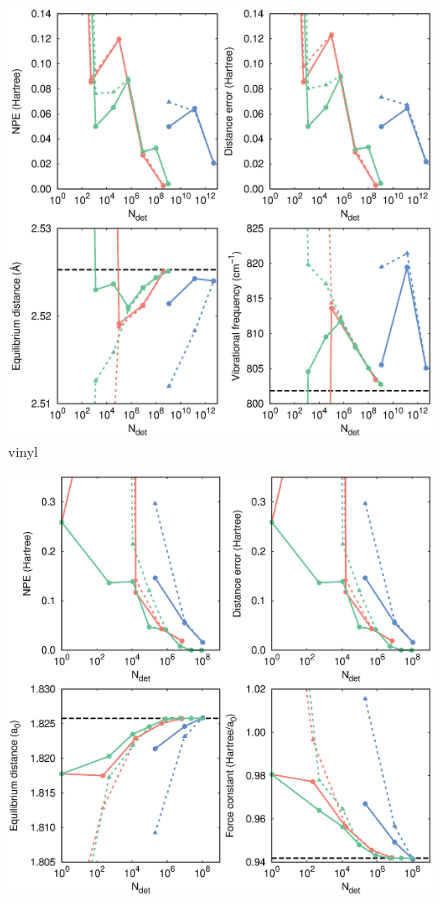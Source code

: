\documentclass[aip,jcp,preprint,noshowkeys,superscriptaddress]{revtex4-1}
\begin{document}
\begin{figure}%
\includegraphics[width=1.0\linewidth]{plot_pt2_rpt2_vinyl}
\caption{
vinyl
}
\label{fig:plot_pt2_rpt2_vinyl}
\end{figure}

\begin{figure}%
\includegraphics[width=1.0\linewidth]{plot_pt2_rpt2_H7}
\caption{
}
\label{fig:plot_pt2_rpt2_h7}
\end{figure}
\end{document}
